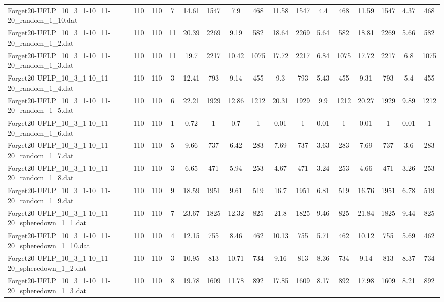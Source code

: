 \begin{sidewaystable}[!ht]
{\begin{tabular}{lccccccccccccccc}
Forget20-UFLP\_10\_3\_1-10\_11-20\_random\_1\_10.dat & 110 & 110 & 7 & 14.61 & 1547 & 7.9 & 468 & 11.58 & 1547 & 4.4 & 468 & 11.59 & 1547 &  \textcolor{blue2}{4.37} & 468 \\
Forget20-UFLP\_10\_3\_1-10\_11-20\_random\_1\_2.dat & 110 & 110 & 11 & 20.39 & 2269 & 9.19 & 582 & 18.64 & 2269 &  \textcolor{blue2}{5.64} & 582 & 18.81 & 2269 & 5.66 & 582 \\
Forget20-UFLP\_10\_3\_1-10\_11-20\_random\_1\_3.dat & 110 & 110 & 11 & 19.7 & 2217 & 10.42 & 1075 & 17.72 & 2217 & 6.84 & 1075 & 17.72 & 2217 &  \textcolor{blue2}{6.8} & 1075 \\
Forget20-UFLP\_10\_3\_1-10\_11-20\_random\_1\_4.dat & 110 & 110 & 3 & 12.41 & 793 & 9.14 & 455 & 9.3 & 793 & 5.43 & 455 & 9.31 & 793 & 5.4 & 455 \\
Forget20-UFLP\_10\_3\_1-10\_11-20\_random\_1\_5.dat & 110 & 110 & 6 & 22.21 & 1929 & 12.86 & 1212 & 20.31 & 1929 & 9.9 & 1212 & 20.27 & 1929 & 9.89 & 1212 \\
Forget20-UFLP\_10\_3\_1-10\_11-20\_random\_1\_6.dat & 110 & 110 & 1 & 0.72 & 1 & 0.7 & 1 &  \textcolor{blue2}{0.01} & 1 &  \textcolor{blue2}{0.01} & 1 &  \textcolor{blue2}{0.01} & 1 &  \textcolor{blue2}{0.01} & 1 \\
Forget20-UFLP\_10\_3\_1-10\_11-20\_random\_1\_7.dat & 110 & 110 & 5 & 9.66 & 737 & 6.42 & 283 & 7.69 & 737 & 3.63 & 283 & 7.69 & 737 &  \textcolor{blue2}{3.6} & 283 \\
Forget20-UFLP\_10\_3\_1-10\_11-20\_random\_1\_8.dat & 110 & 110 & 3 & 6.65 & 471 & 5.94 & 253 & 4.67 & 471 & 3.24 & 253 & 4.66 & 471 & 3.26 & 253 \\
Forget20-UFLP\_10\_3\_1-10\_11-20\_random\_1\_9.dat & 110 & 110 & 9 & 18.59 & 1951 & 9.61 & 519 & 16.7 & 1951 & 6.81 & 519 & 16.76 & 1951 & 6.78 & 519 \\
Forget20-UFLP\_10\_3\_1-10\_11-20\_spheredown\_1\_1.dat & 110 & 110 & 7 & 23.67 & 1825 & 12.32 & 825 & 21.8 & 1825 & 9.46 & 825 & 21.84 & 1825 &  \textcolor{blue2}{9.44} & 825 \\
Forget20-UFLP\_10\_3\_1-10\_11-20\_spheredown\_1\_10.dat & 110 & 110 & 4 & 12.15 & 755 & 8.46 & 462 & 10.13 & 755 & 5.71 & 462 & 10.12 & 755 & 5.69 & 462 \\
Forget20-UFLP\_10\_3\_1-10\_11-20\_spheredown\_1\_2.dat & 110 & 110 & 3 & 10.95 & 813 & 10.71 & 734 & 9.16 & 813 & 8.36 & 734 & 9.14 & 813 & 8.37 & 734 \\
Forget20-UFLP\_10\_3\_1-10\_11-20\_spheredown\_1\_3.dat & 110 & 110 & 8 & 19.78 & 1609 & 11.78 & 892 & 17.85 & 1609 &  \textcolor{blue2}{8.17} & 892 & 17.98 & 1609 & 8.21 & 892 \\

\end{tabular}}
\end{sidewaystable}
